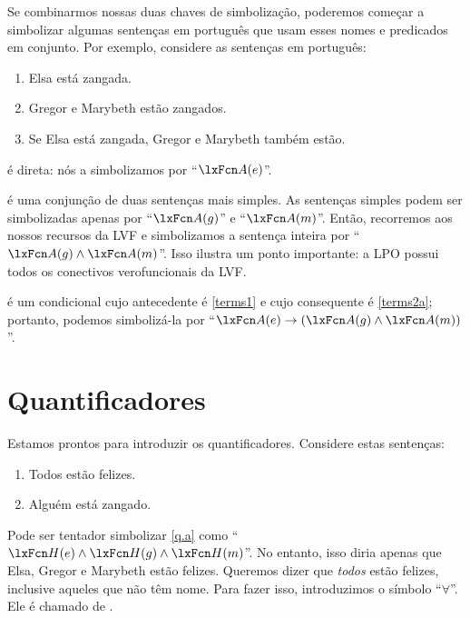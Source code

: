 Se combinarmos nossas duas chaves de simbolização, poderemos começar a simbolizar algumas sentenças em português que usam esses nomes e predicados em conjunto. Por exemplo, considere as sentenças em português:
	\begin{enumerate}
		\item\label{terms1} Elsa está zangada.
		\item\label{terms2a} Gregor e Marybeth estão zangados.
		\item\label{terms2} Se Elsa está zangada, Gregor e Marybeth também estão.
	\end{enumerate}
 é direta: nós a simbolizamos por \textquotedblleft $\atom{A}{e}$\textquotedblright{}.

 é uma conjunção de duas sentenças mais simples. As sentenças simples podem ser simbolizadas apenas por \textquotedblleft $\atom{A}{g}$\textquotedblright{} e \textquotedblleft $\atom{A}{m}$\textquotedblright{}. Então, recorremos aos nossos recursos da LVF e simbolizamos a sentença inteira por \textquotedblleft $\atom{A}{g} \eand \atom{A}{m}$\textquotedblright{}. Isso ilustra um ponto importante: a LPO possui todos os conectivos verofuncionais da LVF.

 é um condicional cujo antecedente é \cref*{terms1} e cujo consequente é \cref*{terms2a}; portanto, podemos simbolizá-la por \textquotedblleft $\atom{A}{e} \eif (\atom{A}{g} \eand \atom{A}{m})$\textquotedblright{}.

\section{Quantificadores}
Estamos prontos para introduzir os quantificadores. Considere estas sentenças:
	\begin{enumerate}
		\item\label{q.a} Todos estão felizes.
		\item\label{q.e} Alguém está zangado.
	\end{enumerate}
Pode ser tentador simbolizar \cref*{q.a} como \textquotedblleft $\atom{H}{e} \eand \atom{H}{g} \eand \atom{H}{m}$\textquotedblright{}. No entanto, isso diria apenas que Elsa, Gregor e Marybeth estão felizes. Queremos dizer que \emph{todos} estão felizes, inclusive aqueles que não têm nome. Para fazer isso, introduzimos o símbolo \textquotedblleft $\forall$\textquotedblright{}. Ele é chamado de .

